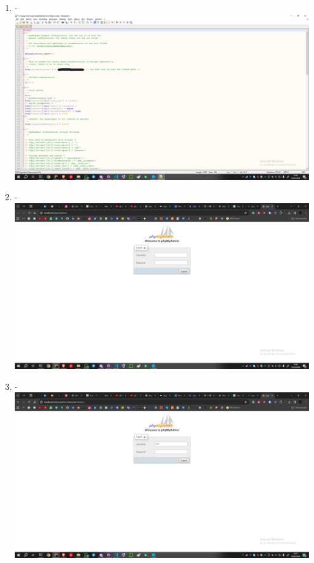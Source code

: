 \documentclass[12pt,titlepage]{article}
\begin{document}
\begin{enumerate}[label= \alph*.]
    \item - \\ \includegraphics[width=.9\textwidth]{images/figures/PHPMyAdmin 4.png}
    \newpage
    \item - \\ \includegraphics[width=.9\textwidth]{images/figures/PHPMyAdmin 5.png}
    \item - \\ \includegraphics[width=.9\textwidth]{images/figures/PHPMyAdmin 6.png}
\end{enumerate}

\newpage
\end{document}
